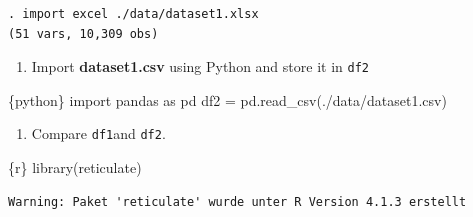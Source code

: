 \documentclass[
  letterpaper,
  DIV=11,
  numbers=noendperiod]{scrreprt}
\newenvironment{Shaded}{\begin{snugshade}}{\end{snugshade}}
\newcommand{\FunctionTok}[1]{\textcolor[rgb]{0.28,0.35,0.67}{#1}}
\newcommand{\ImportTok}[1]{\textcolor[rgb]{0.00,0.46,0.62}{#1}}
\newcommand{\InformationTok}[1]{\textcolor[rgb]{0.37,0.37,0.37}{#1}}
\newcommand{\NormalTok}[1]{\textcolor[rgb]{0.00,0.23,0.31}{#1}}
\newcommand{\OperatorTok}[1]{\textcolor[rgb]{0.37,0.37,0.37}{#1}}
\newcommand{\SpecialCharTok}[1]{\textcolor[rgb]{0.37,0.37,0.37}{#1}}
\newcommand{\StringTok}[1]{\textcolor[rgb]{0.13,0.47,0.30}{#1}}
\providecommand{\tightlist}{%
  \setlength{\itemsep}{0pt}\setlength{\parskip}{0pt}}\usepackage{longtable,booktabs,array}
\begin{document}
\begin{verbatim}
. import excel ./data/dataset1.xlsx
(51 vars, 10,309 obs)
\end{verbatim}

\begin{enumerate}
\def\labelenumi{\arabic{enumi}.}
\setcounter{enumi}{1}
\tightlist
\item
  Import \textbf{dataset1.csv} using Python and store it in \texttt{df2}
\end{enumerate}

\begin{Shaded}
\begin{Highlighting}[]
\InformationTok{\textasciigrave{}\textasciigrave{}\textasciigrave{}\{python\}}
\ImportTok{import}\NormalTok{ pandas }\ImportTok{as}\NormalTok{ pd}
\NormalTok{df2 }\OperatorTok{=}\NormalTok{ pd.read\_csv(}\StringTok{\textquotesingle{}./data/dataset1.csv\textquotesingle{}}\NormalTok{)}
\InformationTok{\textasciigrave{}\textasciigrave{}\textasciigrave{}}
\end{Highlighting}
\end{Shaded}

\begin{enumerate}
\def\labelenumi{\arabic{enumi}.}
\setcounter{enumi}{2}
\tightlist
\item
  Compare \texttt{df1}and \texttt{df2}.
\end{enumerate}

\begin{Shaded}
\begin{Highlighting}[]
\InformationTok{\textasciigrave{}\textasciigrave{}\textasciigrave{}\{r\}}
\FunctionTok{library}\NormalTok{(reticulate)}
\InformationTok{\textasciigrave{}\textasciigrave{}\textasciigrave{}}
\end{Highlighting}
\end{Shaded}

\begin{verbatim}
Warning: Paket 'reticulate' wurde unter R Version 4.1.3 erstellt
\end{verbatim}

\begin{Shaded}
\end{Shaded}
\end{document}

